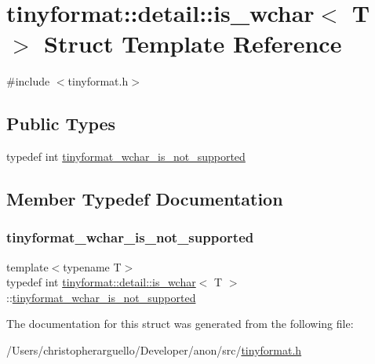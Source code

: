 \hypertarget{structtinyformat_1_1detail_1_1is__wchar}{}\section{tinyformat\+:\+:detail\+:\+:is\+\_\+wchar$<$ T $>$ Struct Template Reference}
\label{structtinyformat_1_1detail_1_1is__wchar}


{\ttfamily \#include $<$tinyformat.\+h$>$}

\subsection*{Public Types}
\begin{DoxyCompactItemize}
\item 
typedef int \mbox{\hyperlink{structtinyformat_1_1detail_1_1is__wchar_a2006c700bf3264d6002993949bbaaac9}{tinyformat\+\_\+wchar\+\_\+is\+\_\+not\+\_\+supported}}
\end{DoxyCompactItemize}


\subsection{Member Typedef Documentation}
\mbox{\label{structtinyformat_1_1detail_1_1is__wchar_a2006c700bf3264d6002993949bbaaac9}} 
\subsubsection{\texorpdfstring{tinyformat\+\_\+wchar\+\_\+is\+\_\+not\+\_\+supported}{tinyformat\_wchar\_is\_not\_supported}}
{\footnotesize\ttfamily template$<$typename T$>$ \\
typedef int \mbox{\hyperlink{structtinyformat_1_1detail_1_1is__wchar}{tinyformat\+::detail\+::is\+\_\+wchar}}$<$ T $>$\+::\mbox{\hyperlink{structtinyformat_1_1detail_1_1is__wchar_a2006c700bf3264d6002993949bbaaac9}{tinyformat\+\_\+wchar\+\_\+is\+\_\+not\+\_\+supported}}}



The documentation for this struct was generated from the following file\+:\begin{DoxyCompactItemize}
\item 
/\+Users/christopherarguello/\+Developer/anon/src/\mbox{\hyperlink{tinyformat_8h}{tinyformat.\+h}}\end{DoxyCompactItemize}

